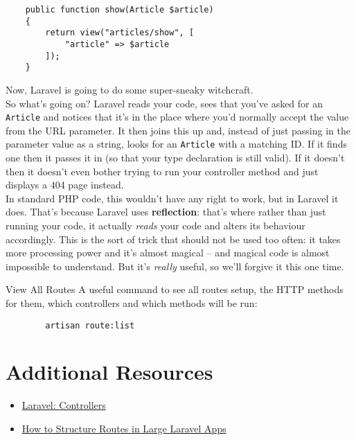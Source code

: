 \begin{verbatim}
    public function show(Article $article)
    {
        return view("articles/show", [
            "article" => $article
        ]);
    }
\end{verbatim}

Now, Laravel is going to do some super-sneaky witchcraft.
\\

So what's going on? Laravel reads your code, sees that you've asked for an \texttt{Article} and notices that it's in the place where you'd normally accept the value from the URL parameter. It then joins this up and, instead of just passing in the parameter value as a string, looks for an \texttt{Article} with a matching ID. If it finds one then it passes it in (so that your type declaration is still valid). If it doesn't then it doesn't even bother trying to run your controller method and just displays a 404 page instead.
\\

In standard PHP code, this wouldn't have any right to work, but in Laravel it does. That's because Laravel uses \textbf{reflection}: that's where rather than just running your code, it actually \textit{reads} your code and alters its behaviour accordingly. This is the sort of trick that should not be used too often: it takes more processing power and it's almost magical – and magical code is almost impossible to understand. But it's \textit{really} useful, so we'll forgive it this one time.


\begin{infobox}{View All Routes}
    A useful command to see all routes setup, the HTTP methods for them, which controllers and which methods will be run:

    \begin{verbatim}
        artisan route:list
    \end{verbatim}

\end{infobox}




\section{Additional Resources}

\begin{itemize}[leftmargin=*]
    \item \href{http://laravel.com/docs/master/controllers}{Laravel: Controllers}
    \item \href{https://laraveldaily.com/how-to-structure-routes-in-large-laravel-projects/}{How to Structure Routes in Large Laravel Apps}
\end{itemize}
